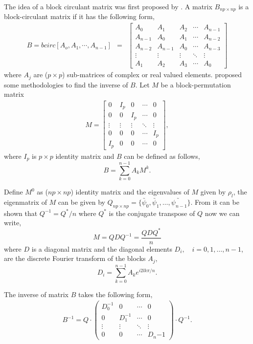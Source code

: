 The idea of a block circulant matrix was first proposed by \cite{Muir1920}. A matrix $B_{np\times np}$ is a block-circulant matrix if it has the following form,
\begin{eqnarray}
	B = bcirc[A_o, A_1,\cdots,A_{n-1}] &=& \left[
		\begin{array}{lllll}
			A_0     & A_1     & A_2    & \cdots & A_{n-1} \\
			A_{n-1} & A_0     & A_1    & \cdots & A_{n-2} \\
			A_{n-2} & A_{n-1} & A_0    & \cdots & A_{n-3} \\
			\vdots  & \vdots  & \vdots & \ddots & \vdots  \\
			A_1     & A_2     & A_3    & \cdots & A_0
		\end{array}
	\right]
\end{eqnarray}
where $A_j$ are ($p \times p$) sub-matrices of complex or real valued elements. \cite{DeMazancourt1983} proposed some methodologies to find the inverse of $B$. Let $M$ be a block-permutation matrix
\begin{eqnarray*}
	M = \left[
		\begin{array}{lllll}
			0       & I_p     & 0      & \cdots & 0 \\
			0       & 0       & I_p    & \cdots & 0 \\
			\vdots  & \vdots  & \vdots & \ddots & \vdots  \\
			0       & 0       & 0      & \cdots & I_p \\
			I_p     & 0     & 0    & \cdots & 0
		\end{array}
	\right],
\end{eqnarray*}
where $I_p$ is $p\times p$ identity matrix and $B$ can be defined as follows,
\[
B = \sum_{k=0}^{n-1} A_k M^k.
\]

Define $M^0$ as ($np\times np$) identity matrix and the eigenvalues of $M$ given by $\rho_l$, the eigenmatrix of $M$ can be given by $Q_{np\times np}=\{ \utilde{\psi_0}, \utilde{\psi_1},\ldots, \utilde{\psi_{n-1}} \}$. From \cite{Trapp1973} it can be shown that $Q^{-1} = Q^*/n$ where $Q^*$ is the conjugate transpose of $Q$ now we can write,
\[
M = QDQ^{-1} = \frac{QDQ^*}{n}
\]
where $D$ is a diagonal matrix and the diagonal elements $D_i, \quad i=0,1,\ldots, n-1$, are the discrete Fourier transform of the blocks $A_j$,
\[
D_i = \sum_{k=0}^{n-1} A_k e^{i2lk\pi/n}.
\]

The inverse of matrix $B$ takes the following form,
\begin{eqnarray*}
	B^{-1} = Q\cdot\left(
		\begin{array}{llll}
			D_0^{-1}  & 0              & \cdots & 0 \\
			0         & D_1^{-1}       & \cdots & 0 \\
			\vdots    & \vdots         & \ddots & \vdots  \\
			0         & 0              & \cdots & D_n{-1}
		\end{array}
	\right)\cdot Q^{-1}.
\end{eqnarray*}

